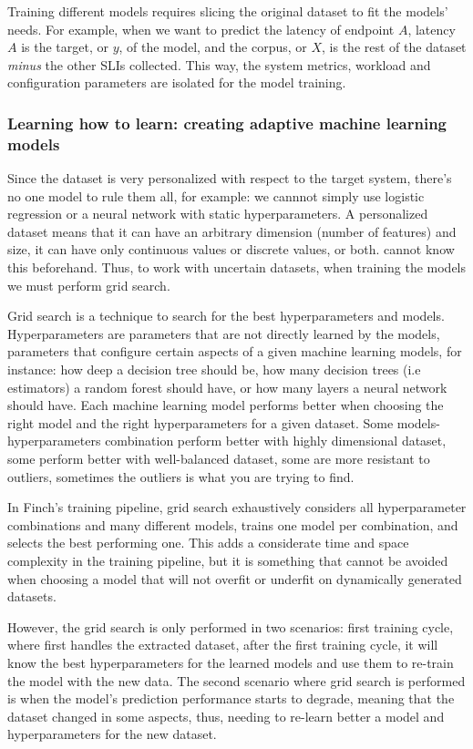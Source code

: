 Training different models requires slicing the original dataset to fit the models' needs. For example, when we want to predict the latency of endpoint $A$, latency $A$ is the target, or $y$, of the model, and the corpus, or $X$, is the rest of the dataset \textit{minus} the other SLIs collected. This way, the system metrics, workload and configuration parameters are isolated for the model training.

\subsubsection{Learning how to learn: creating adaptive machine learning models}

Since the dataset is very personalized with respect to the target system, there's no one model to rule them all, for example: we cannnot simply use logistic regression or a neural network with static hyperparameters. A personalized dataset means that it can have an arbitrary dimension (number of features) and size, it can have only continuous values or discrete values, or both. \projectname{} cannot know this beforehand. Thus, to work with uncertain datasets, when training the models we must perform grid search.

Grid search is a technique to search for the best hyperparameters and models. Hyperparameters are parameters that are not directly learned by the models, parameters that configure certain aspects of a given machine learning models, for instance: how deep a decision tree should be, how many decision trees (i.e estimators) a random forest should have, or how many layers a neural network should have. Each machine learning model performs better when choosing the right model and the right hyperparameters for a given dataset. Some models-hyperparameters combination perform better with highly dimensional dataset, some perform better with well-balanced dataset, some are more resistant to outliers, sometimes the outliers is what you are trying to find.

In Finch's training pipeline, grid search exhaustively considers all hyperparameter combinations and many different models, trains one model per combination, and selects the best performing one. This adds a considerate time and space complexity in the training pipeline, but it is something that cannot be avoided when choosing a model that will not overfit or underfit on dynamically generated datasets. 

However, the grid search is only performed in two scenarios: first training cycle, where \projectname{} first handles the extracted dataset, after the first training cycle, it will know the best hyperparameters for the learned models and use them to re-train the model with the new data. The second scenario where grid search is performed is when the model's prediction performance starts to degrade, meaning that the dataset changed in some aspects, thus, needing to re-learn better a model and hyperparameters for the new dataset.

